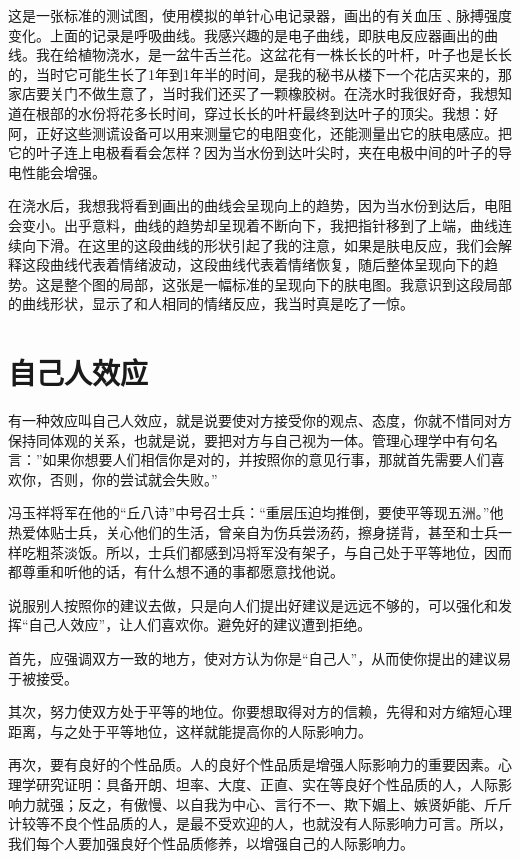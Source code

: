 \documentclass[11pt]{ctexart}
\begin{document}
这是一张标准的测试图，使用模拟的单针心电记录器，画出的有关血压﹑脉搏强度变化。上面的记录是呼吸曲线。我感兴趣的是电子曲线，即肤电反应器画出的曲线。我在给植物浇水，是一盆牛舌兰花。这盆花有一株长长的叶杆，叶子也是长长的，当时它可能生长了1年到1年半的时间，是我的秘书从楼下一个花店买来的，那家店要关门不做生意了，当时我们还买了一颗橡胶树。在浇水时我很好奇，我想知道在根部的水份将花多长时间，穿过长长的叶杆最终到达叶子的顶尖。我想：好阿，正好这些测谎设备可以用来测量它的电阻变化，还能测量出它的肤电感应。把它的叶子连上电极看看会怎样？因为当水份到达叶尖时，夹在电极中间的叶子的导电性能会增强。

在浇水后，我想我将看到画出的曲线会呈现向上的趋势，因为当水份到达后，电阻会变小。出乎意料，曲线的趋势却呈现着不断向下，我把指针移到了上端，曲线连续向下滑。在这里的这段曲线的形状引起了我的注意，如果是肤电反应，我们会解释这段曲线代表着情绪波动，这段曲线代表着情绪恢复，随后整体呈现向下的趋势。这是整个图的局部，这张是一幅标准的呈现向下的肤电图。我意识到这段局部的曲线形状，显示了和人相同的情绪反应，我当时真是吃了一惊。
\section{自己人效应}
\label{sec-97}


有一种效应叫自己人效应，就是说要使对方接受你的观点、态度，你就不惜同对方保持同体观的关系，也就是说，要把对方与自己视为一体。管理心理学中有句名言：''如果你想要人们相信你是对的，并按照你的意见行事，那就首先需要人们喜欢你，否则，你的尝试就会失败。''

冯玉祥将军在他的“丘八诗”中号召士兵：“重层压迫均推倒，要使平等现五洲。”他热爱体贴士兵，关心他们的生活，曾亲自为伤兵尝汤药，擦身搓背，甚至和士兵一样吃粗茶淡饭。所以，士兵们都感到冯将军没有架子，与自己处于平等地位，因而都尊重和听他的话，有什么想不通的事都愿意找他说。

说服别人按照你的建议去做，只是向人们提出好建议是远远不够的，可以强化和发挥“自己人效应”，让人们喜欢你。避免好的建议遭到拒绝。

首先，应强调双方一致的地方，使对方认为你是“自己人”，从而使你提出的建议易于被接受。

其次，努力使双方处于平等的地位。你要想取得对方的信赖，先得和对方缩短心理距离，与之处于平等地位，这样就能提高你的人际影响力。

再次，要有良好的个性品质。人的良好个性品质是增强人际影响力的重要因素。心理学研究证明：具备开朗、坦率、大度、正直、实在等良好个性品质的人，人际影响力就强；反之，有傲慢、以自我为中心、言行不一、欺下媚上、嫉贤妒能、斤斤计较等不良个性品质的人，是最不受欢迎的人，也就没有人际影响力可言。所以，我们每个人要加强良好个性品质修养，以增强自己的人际影响力。
\end{document}
